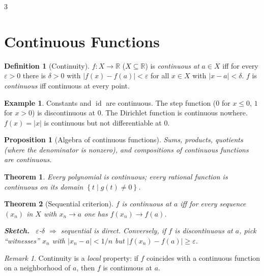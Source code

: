 \documentclass[10pt,a4paper,landscape]{article}
\theoremstyle{definition}
\newtheorem{defn}{Definition}[section]
\newtheorem{exm}{Example}[section]
\theoremstyle{plain}
\newtheorem{thm}{Theorem}[section]
\newtheorem{prop}{Proposition}[section]
\theoremstyle{remark}
\newtheorem{rem}{Remark}[section]
\newcommand{\R}{\mathbb{R}}
\newcommand{\eps}{\varepsilon}
\newcommand{\id}{\operatorname{id}}
\newcommand{\abs}[1]{\lvert #1 \rvert}
\newcommand{\set}[1]{\left\{ #1 \right\}}
\newenvironment{proofsketch}{%
  \par\small\color{exgray}\textbf{Sketch.}\ }%
  {\par}
\begin{document}
\begin{multicols*}{3}
\section{Continuous Functions}

\begin{defn}[Continuity]
$f: X \to \R$ ($X \subseteq \R$) is \emph{continuous at} $a \in X$ iff for every $\eps > 0$ there is $\delta > 0$ with $\abs{f(x) - f(a)} < \eps$ for all $x \in X$ with $\abs{x - a} < \delta$. $f$ is \emph{continuous} iff continuous at every point.
\end{defn}

\begin{exm}
Constants and $\id$ are continuous. The step function ($0$ for $x \le 0$, $1$ for $x>0$) is discontinuous at $0$. The Dirichlet function is continuous nowhere. $f(x)=\abs{x}$ is continuous but not differentiable at $0$.
\end{exm}

\begin{prop}[Algebra of continuous functions]
Sums, products, quotients (where the denominator is nonzero), and compositions of continuous functions are continuous.
\end{prop}

\begin{thm}
Every polynomial is continuous; every rational function is continuous on its domain $\set{t \mid g(t) \neq 0}$.
\end{thm}

\begin{thm}[Sequential criterion]
$f$ is continuous at $a$ iff for every sequence $(x_n)$ in $X$ with $x_n \to a$ one has $f(x_n) \to f(a)$.
\begin{proofsketch}
$\eps$-$\delta$ $\Rightarrow$ sequential is direct. Conversely, if $f$ is discontinuous at $a$, pick ``witnesses'' $x_n$ with $\abs{x_n - a} < 1/n$ but $\abs{f(x_n) - f(a)} \ge \eps$.
\end{proofsketch}
\end{thm}

\begin{rem}
Continuity is a \emph{local} property: if $f$ coincides with a continuous function on a neighborhood of $a$, then $f$ is continuous at $a$.
\end{rem}


\end{multicols*}
\end{document}
